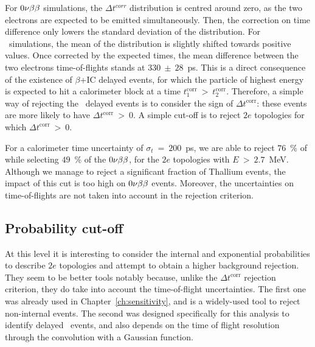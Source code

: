 For $0\nu\beta\beta$ simulations, the $\Delta t^{corr}$ distribution is centred around zero, as the two electrons are expected to be emitted simultaneously.
Then, the correction on time difference only lowers the standard deviation of the distribution.
For \Tl\ simulations, the mean of the distribution is slightly shifted towards positive values.
Once corrected by the expected times, the mean difference between the two electrons time-of-flights stands at $330~\pm~28$~ps.
This is a direct consequence of the existence of $\beta$+IC delayed events, for which the particle of highest energy is expected to hit a calorimeter block at a time $t^{\text{corr}}_{1}~>~t^{\text{corr}}_{2}$.
Therefore, a simple way of rejecting the \Tl\ delayed events is to consider the sign of $\Delta t^{\text{corr}}$: these events are more likely to have $\Delta t^{\text{corr}}~>~0$.
A simple cut-off is to reject $2e$ topologies for which $\Delta t^{\text{corr}}~>~0$.

For a calorimeter time uncertainty of $\sigma_{t}~=~200$~ps, we are able to reject $76$~\% of \Tl\, while selecting $49$~\% of the $0\nu\beta\beta$, for the $2e$ topologies with $E~>~2.7$~MeV.
Although we manage to reject a significant fraction of Thallium events, the impact of this cut is too high on $0\nu\beta\beta$ events.
Moreover, the uncertainties on time-of-flights are not taken into account in the rejection criterion.

\subsection{Probability cut-off}

At this level it is interesting to consider the internal and exponential probabilities to describe $2e$ topologies and attempt to obtain a higher background rejection.
They seem to be better tools notably because, unlike the $\Delta t^{\text{corr}}$ rejection criterion, they do take into account the time-of-flight uncertainties.
The first one was already used in Chapter~\ref{ch:sensitivity}, and is a widely-used tool to reject non-internal events.
The second was designed specifically for this analysis to identify delayed \Tl\ events, and also depends on the time of flight resolution through the convolution with a Gaussian function.

